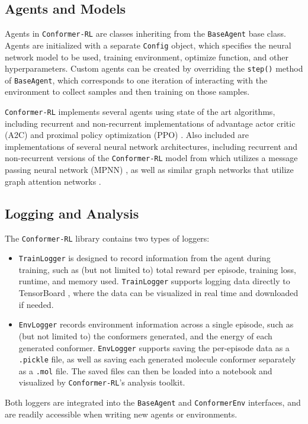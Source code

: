 \documentclass[twoside,11pt]{article}
\newcommand{\code}[1]{\texttt{#1}}
\newcommand{\titleofpaper}{Conformer-RL}
\begin{document}
\subsection{Agents and Models}
Agents in \code{\titleofpaper} are classes inheriting from the \code{BaseAgent} base class. Agents are initialized with a separate \code{Config} object, which specifies the neural network model to be used, training environment, optimize function, and other hyperparameters. Custom agents can be created by overriding the \code{step()} method of \code{BaseAgent}, which corresponds to one iteration of interacting with the environment to collect samples and then training on those samples. 

\code{\titleofpaper} implements several agents using state of the art algorithms, including recurrent and non-recurrent implementations of advantage actor critic (A2C) \citep{wu2017a2c} and proximal policy optimization (PPO) \citep{schulman2017ppo}. Also included are implementations of several neural network architectures, including recurrent and non-recurrent versions of the \code{\titleofpaper} model from \citep{gogineni2020torsionnet} which utilizes a message passing neural network (MPNN) \citep{gilmer2017mpnn}, as well as similar graph networks that utilize graph attention networks \citep{gatnn}.

\subsection{Logging and Analysis}
The \code{\titleofpaper} library contains two types of loggers:
\begin{itemize}
  \item \code{TrainLogger} is designed to record information from the agent during training, such as (but not limited to) total reward per episode, training loss, runtime, and memory used. \code{TrainLogger} supports logging data directly to TensorBoard \citep{tensorflow2015-whitepaper}, where the data can be visualized in real time and downloaded if needed.
  \item \code{EnvLogger} records environment information across a single episode, such as (but not limited to) the conformers generated, and the energy of each generated conformer. \code{EnvLogger} supports saving the per-episode data as a \code{.pickle} file, as well as saving each generated molecule conformer separately as a \code{.mol} file. The saved files can then be loaded into a notebook and visualized by \code{\titleofpaper}'s analysis toolkit.
\end{itemize}
Both loggers are integrated into the \code{BaseAgent} and \code{ConformerEnv} interfaces, and are readily accessible when writing new agents or environments.
\end{document}

